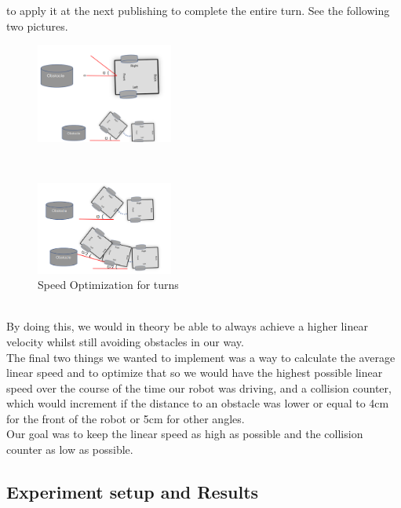 \documentclass[conference]{IEEEtran}
\begin{document}
to apply it at the next publishing to complete the entire turn. See the following two pictures. \cite{b7}\\
\begin{figure}[h] %
    \centering
    \includegraphics[width=0.4\textwidth]{betterNav1.png}
\end{figure}\\
\begin{figure}[h] %
    \centering
    \includegraphics[width=0.4\textwidth]{betterNav2.png}
    \caption{Speed Optimization for turns}
\end{figure} \\
By doing this, we would in theory be able to always achieve a higher linear velocity whilst still avoiding 
obstacles in our way.\\
The final two things we wanted to implement was a way to calculate the average linear speed and to optimize 
that so we would have the highest possible linear speed over the course of the time our robot was driving, 
and a collision counter, which would increment if the distance to an obstacle was lower or equal to 4cm for 
the front of the robot or 5cm for other angles.\\
Our goal was to keep the linear speed as high as possible and the collision counter as low as possible.\\

\subsection{Experiment setup and Results}\label{experiment}
\end{document}
